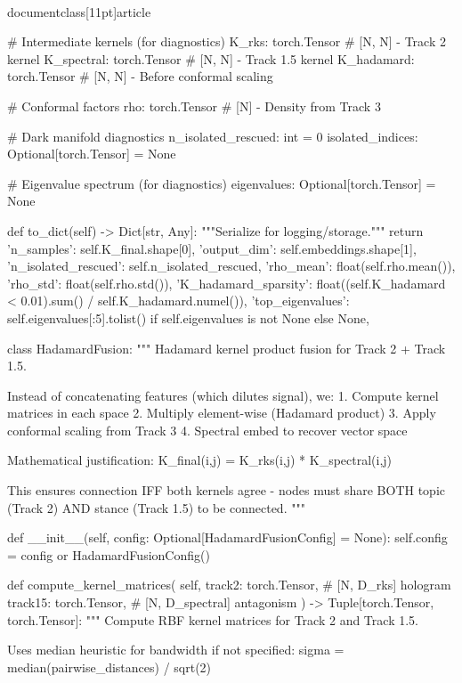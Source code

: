 \\documentclass[11pt]{article}
\begin{document}
\begin{CodeBlock}
    # Intermediate kernels (for diagnostics)
    K_rks: torch.Tensor                    # [N, N] - Track 2 kernel
    K_spectral: torch.Tensor               # [N, N] - Track 1.5 kernel
    K_hadamard: torch.Tensor               # [N, N] - Before conformal scaling

    # Conformal factors
    rho: torch.Tensor                      # [N] - Density from Track 3

    # Dark manifold diagnostics
    n_isolated_rescued: int = 0
    isolated_indices: Optional[torch.Tensor] = None

    # Eigenvalue spectrum (for diagnostics)
    eigenvalues: Optional[torch.Tensor] = None

    def to_dict(self) -> Dict[str, Any]:
        """Serialize for logging/storage."""
        return {
            'n_samples': self.K_final.shape[0],
            'output_dim': self.embeddings.shape[1],
            'n_isolated_rescued': self.n_isolated_rescued,
            'rho_mean': float(self.rho.mean()),
            'rho_std': float(self.rho.std()),
            'K_hadamard_sparsity': float((self.K_hadamard < 0.01).sum() / self.K_hadamard.numel()),
            'top_eigenvalues': self.eigenvalues[:5].tolist() if self.eigenvalues is not None else None,
        }


class HadamardFusion:
    """
    Hadamard kernel product fusion for Track 2 + Track 1.5.

    Instead of concatenating features (which dilutes signal), we:
    1. Compute kernel matrices in each space
    2. Multiply element-wise (Hadamard product)
    3. Apply conformal scaling from Track 3
    4. Spectral embed to recover vector space

    Mathematical justification:
        K_final(i,j) = K_rks(i,j) * K_spectral(i,j)

    This ensures connection IFF both kernels agree - nodes must share
    BOTH topic (Track 2) AND stance (Track 1.5) to be connected.
    """

    def __init__(self, config: Optional[HadamardFusionConfig] = None):
        self.config = config or HadamardFusionConfig()

    def compute_kernel_matrices(
        self,
        track2: torch.Tensor,   # [N, D_rks] hologram
        track15: torch.Tensor,  # [N, D_spectral] antagonism
    ) -> Tuple[torch.Tensor, torch.Tensor]:
        """
        Compute RBF kernel matrices for Track 2 and Track 1.5.

        Uses median heuristic for bandwidth if not specified:
            sigma = median(pairwise_distances) / sqrt(2)


\end{CodeBlock}
\end{document}
